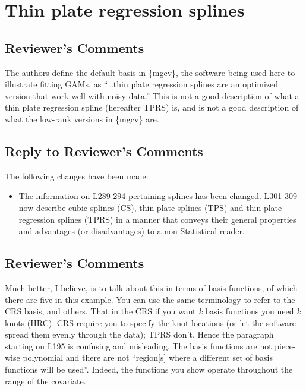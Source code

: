 \documentclass[
]{article}
\providecommand{\tightlist}{%
  \setlength{\itemsep}{0pt}\setlength{\parskip}{0pt}}
\begin{document}
\hypertarget{thin-plate-regression-splines}{%
\section{Thin plate regression splines}\label{thin-plate-regression-splines}}

\hypertarget{reviewers-comments-3}{%
\subsection{Reviewer's Comments}\label{reviewers-comments-3}}

The authors define the default basis in \{mgcv\}, the software being used here to illustrate fitting GAMs, as ``\ldots thin plate regression splines are an optimized version that work well with noisy data.'' This is not a good description of what a thin plate regression spline (hereafter TPRS) is, and is not a good description of what the low-rank versions in \{mgcv\} are.

\hypertarget{section-4}{%
\subsection{\texorpdfstring{\textcolor{reviewersblue} {Reply to Reviewer's Comments}}{}}\label{section-4}}

The following changes have been made:

\begin{itemize}
\tightlist
\item
  The information on L289-294 pertaining splines has been changed. L301-309 now describe cubic splines (CS), thin plate splines (TPS) and thin plate regression splines (TPRS) in a manner that conveys their general properties and advantages (or disadvantages) to a non-Statistical reader.
\end{itemize}

\hypertarget{reviewers-comments-4}{%
\subsection{Reviewer's Comments}\label{reviewers-comments-4}}

Much better, I believe, is to talk about this in terms of basis functions, of which there are five in this example. You can use the same terminology to refer to the CRS basis, and others. That in the CRS if you want \emph{k} basis functions you need \emph{k} knots (IIRC). CRS require you to specify the knot locations (or let the software spread them evenly through the data); TPRS don't.
Hence the paragraph starting on L195 is confusing and misleading. The basis functions are not piece-wise polynomial and there are not ``region{[}s{]} where a different set of basis functions will be used''. Indeed, the functions you show
operate throughout the range of the covariate.
\end{document}

